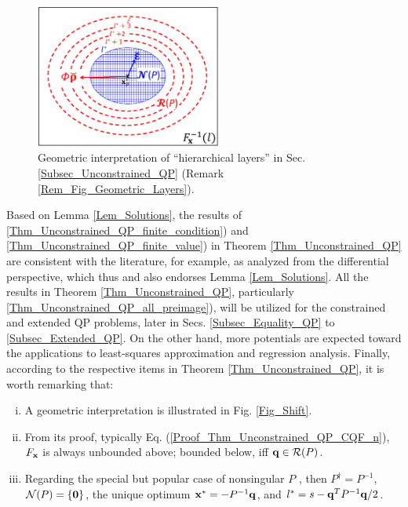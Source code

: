 \documentclass{imaman}
\newcommand{\bfx}{{\bf x}}
\newcommand{\bfq}{{\bf q}}
\newcommand{\bfzero}{{\bf 0}}
\newcommand{\calN}{{\mathcal N}}
\newcommand{\calR}{{\mathcal R}}
\numberwithin{equation}{section}
\begin{document}
\begin{figure}[htbp]
    \begin{center}
    \includegraphics[width=6.1cm]{Fig_Layers.eps}
    \caption{Geometric interpretation of ``hierarchical layers'' in Sec. {\rm\ref{Subsec_Unconstrained_QP}} (Remark {\rm\ref{Rem_Fig_Geometric_Layers}}).}
    \label{Fig_Layers}
    \end{center}
\end{figure}

\begin{remark}
Based on Lemma \ref{Lem_Solutions}, the results of \ref{Thm_Unconstrained_QP_finite_condition}) and \ref{Thm_Unconstrained_QP_finite_value}) in Theorem \ref{Thm_Unconstrained_QP} are consistent with the literature, for example, \cite{BoVa:04} as analyzed from the differential perspective, which thus and also endorses Lemma \ref{Lem_Solutions}. All the results in Theorem \ref{Thm_Unconstrained_QP}, particularly \ref{Thm_Unconstrained_QP_all_preimage}), will be utilized for the constrained and extended QP problems, later in Secs. \ref{Subsec_Equality_QP} to \ref{Subsec_Extended_QP}. On the other hand, more potentials are expected toward the applications to least-squares approximation and regression analysis. Finally, according to the respective items in Theorem \ref{Thm_Unconstrained_QP}, it is worth remarking that:
\begin{enumerate}[i)]
\item A geometric interpretation is illustrated in Fig. \ref{Fig_Shift}.
\item From its proof, typically Eq. (\ref{Proof_Thm_Unconstrained_QP_CQF_n}), $F_\bfx$ is always unbounded above; bounded below, iff $\bfq\in\calR(P)$.
\item Regarding the special but popular case of nonsingular $P$ \citep{Lu(Ye):03(16)}, then $P^\dagger=P^{-1}$, $\calN(P)=\{\bfzero\}$, the unique optimum $\bfx^*=-P^{-1}\bfq$, and $l^*=s-\bfq^TP^{-1}\bfq/2$.
\end{enumerate}
\label{Rem_Unconstrained_QP}
\end{remark}
\end{document}
